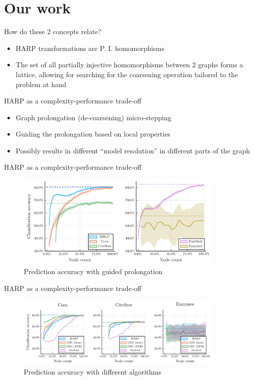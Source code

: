 \documentclass[10pt]{beamer}
\begin{document}
\section{Our work}

\begin{frame}{How do these 2 concepts relate?}
	\begin{itemize}
		\item HARP transformations are P. I. homomorphisms
		\item The set of all partially injective homomorphisms between 2 graphs forms a lattice, allowing for searching for the coarsening operation tailored to the problem at hand
	\end{itemize}
\end{frame}

\begin{frame}{HARP as a complexity-performance trade-off}
	\begin{itemize}
		\item Graph prolongation (de-coarsening) micro-stepping
		\item Guiding the prolongation based on local properties
		\item Possibly results in different \enquote{model resolution} in different parts of the graph
	\end{itemize}
\end{frame}

\begin{frame}{HARP as a complexity-performance trade-off}
	\begin{figure}
		\centering
		\includegraphics[width=0.9\textwidth]{images/adaptive-coarsening/adaptive-coarsening.pdf}
		\caption{Prediction accuracy with guided prolongation}
	\end{figure}
\end{frame}

\begin{frame}{HARP as a complexity-performance trade-off}
	\begin{figure}
		\centering
		\includegraphics[width=0.9\textwidth]{images/coarsening-algorithms/coarsening-algorithms.pdf}
		\caption{Prediction accuracy with different algorithms}
	\end{figure}
\end{frame}
\end{document}
